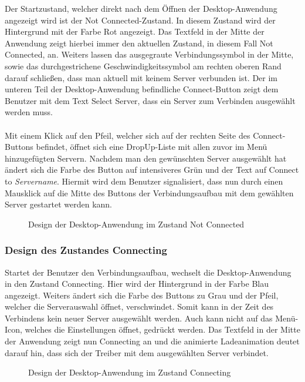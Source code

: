 Der Startzustand, welcher direkt nach dem Öffnen der Desktop-Anwendung angezeigt wird ist der Not Connected-Zustand. In diesem Zustand wird der Hintergrund mit der Farbe Rot angezeigt. Das Textfeld in der Mitte der Anwendung zeigt hierbei immer den aktuellen Zustand, in diesem Fall Not Connected, an. Weiters lassen das ausgegraute Verbindungssymbol in der Mitte, sowie das durchgestrichene Geschwindigkeitssymbol am rechten oberen Rand darauf schließen, dass man aktuell mit keinem Server verbunden ist.
Der im unteren Teil der Desktop-Anwendung befindliche Connect-Button zeigt dem Benutzer mit dem Text Select Server, dass ein Server zum Verbinden ausgewählt werden muss.
\\ \ \\
Mit einem Klick auf den Pfeil, welcher sich auf der rechten Seite des Connect-Buttons befindet, öffnet sich eine DropUp-Liste mit allen zuvor im Menü hinzugefügten Servern. Nachdem man den gewünschten Server ausgewählt hat ändert sich die Farbe des Button auf intensiveres Grün und der Text auf Connect to \textit{Servername}. Hiermit wird dem Benutzer signalisiert, dass nun durch einen Mausklick auf die Mitte des Buttons der Verbindungsaufbau mit dem gewählten Server gestartet werden kann.
\\
\begin{figure}[H]
    \centering
    \setlength{\fboxsep}{1pt}
	\setlength{\fboxrule}{1pt}
    \caption{Design der Desktop-Anwendung im Zustand Not Connected} 
\end{figure}

\pagebreak

\subsubsection{Design des Zustandes Connecting}

Startet der Benutzer den Verbindungsaufbau, wechselt die Desktop-Anwendung in den Zustand Connecting. Hier wird der Hintergrund in der Farbe Blau angezeigt. Weiters ändert sich die Farbe des Buttons zu Grau und der Pfeil, welcher die Serverauswahl öffnet, verschwindet. Somit kann in der Zeit des Verbindens kein neuer Server ausgewählt werden. Auch kann nicht auf das Menü-Icon, welches die Einstellungen öffnet, gedrückt werden. Das Textfeld in der Mitte der Anwendung zeigt nun Connecting an und die animierte Ladeanimation deutet darauf hin, dass sich der Treiber mit dem ausgewählten Server verbindet.
\\
\begin{figure}[H]
    \centering
    \setlength{\fboxsep}{1pt}
	\setlength{\fboxrule}{1pt}
    \caption{Design der Desktop-Anwendung im Zustand Connecting} 
\end{figure}

